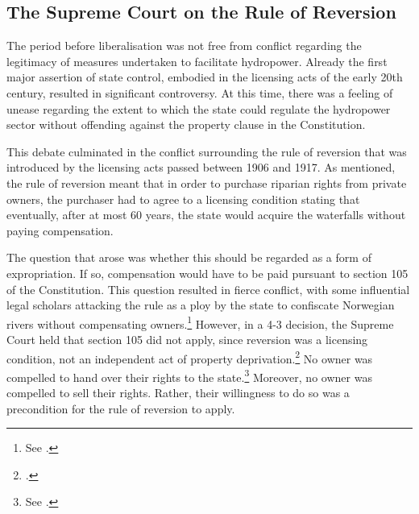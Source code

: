 
\subsection{The Supreme Court on the Rule of Reversion}\label{sec:prelib}

The period before liberalisation was not free from conflict regarding the legitimacy of measures undertaken to facilitate hydropower. Already the first major assertion of state control, embodied in the licensing acts of the early 20th century, resulted in significant controversy. At this time, there was a feeling of unease regarding the extent to which the state could regulate the hydropower sector without offending against the property clause in the Constitution.

This debate culminated in the conflict surrounding the rule of reversion that was introduced by the licensing acts passed between 1906 and 1917. As mentioned, the rule of reversion meant that in order to purchase riparian rights from private owners, the purchaser had to agree to a licensing condition stating that eventually, after at most 60 years, the state would acquire the waterfalls without paying compensation.

The question that arose was whether this should be regarded as a form of expropriation. If so, compensation would have to be paid pursuant to section 105 of the Constitution. This question resulted in fierce conflict, with some influential legal scholars attacking the rule as a ploy by the state to confiscate Norwegian rivers without compensating owners.\footnote{See \cite{morgenstierne14}.} However, in a 4-3 decision, the Supreme Court held that section 105 did not apply, since reversion was a licensing condition, not an independent act of property deprivation.\footcite{johansen18} No owner was compelled to hand over their rights to the state.\footnote{See \cite[406]{johansen18}.} Moreover, no owner was compelled to sell their rights. Rather, their willingness to do so was a precondition for the rule of reversion to apply.

